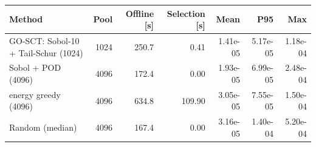 \begin{tabular}{lrrrrrr}
\toprule
Method & Pool & Offline [s] & Selection [s] & Mean & P95 & Max \\
\midrule
GO-SCT: Sobol-10 + Tail-Schur (1024) & 1024 & 250.7 & 0.41 & 1.41e-05 & 5.17e-05 & 1.18e-04 \\
Sobol + POD (4096) & 4096 & 172.4 & 0.00 & 1.93e-05 & 6.99e-05 & 2.48e-04 \\
energy greedy (4096) & 4096 & 634.8 & 109.90 & 3.05e-05 & 7.55e-05 & 1.50e-04 \\
Random (median) & 4096 & 167.4 & 0.00 & 3.16e-05 & 1.40e-04 & 5.20e-04 \\
\bottomrule
\end{tabular}
